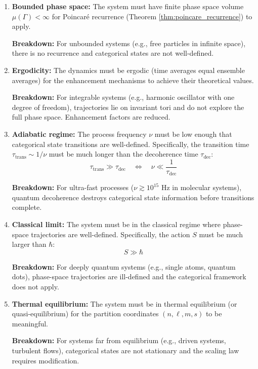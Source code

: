 \documentclass[twocolumn,10pt]{article}
\theoremstyle{remark}
\begin{document}
\begin{enumerate}
    \item \textbf{Bounded phase space:} The system must have finite phase space volume $\mu(\Gamma) < \infty$ for Poincaré recurrence (Theorem \ref{thm:poincare_recurrence}) to apply.
    
    \textbf{Breakdown:} For unbounded systems (e.g., free particles in infinite space), there is no recurrence and categorical states are not well-defined.
    
    \item \textbf{Ergodicity:} The dynamics must be ergodic (time averages equal ensemble averages) for the enhancement mechanisms to achieve their theoretical values.
    
    \textbf{Breakdown:} For integrable systems (e.g., harmonic oscillator with one degree of freedom), trajectories lie on invariant tori and do not explore the full phase space. Enhancement factors are reduced.
    
    \item \textbf{Adiabatic regime:} The process frequency $\nu$ must be low enough that categorical state transitions are well-defined. Specifically, the transition time $\tau_{\text{trans}} \sim 1/\nu$ must be much longer than the decoherence time $\tau_{\text{dec}}$:
    \begin{equation}
        \tau_{\text{trans}} \gg \tau_{\text{dec}} \quad \Leftrightarrow \quad \nu \ll \frac{1}{\tau_{\text{dec}}}
        \label{eq:adiabatic_condition}
    \end{equation}
    
    \textbf{Breakdown:} For ultra-fast processes ($\nu \gtrsim 10^{15}$ Hz in molecular systems), quantum decoherence destroys categorical state information before transitions complete.
    
    \item \textbf{Classical limit:} The system must be in the classical regime where phase-space trajectories are well-defined. Specifically, the action $S$ must be much larger than $\hbar$:
    \begin{equation}
        S \gg \hbar
        \label{eq:classical_condition}
    \end{equation}
    
    \textbf{Breakdown:} For deeply quantum systems (e.g., single atoms, quantum dots), phase-space trajectories are ill-defined and the categorical framework does not apply.
    
    \item \textbf{Thermal equilibrium:} The system must be in thermal equilibrium (or quasi-equilibrium) for the partition coordinates $(n, \ell, m, s)$ to be meaningful.
    
    \textbf{Breakdown:} For systems far from equilibrium (e.g., driven systems, turbulent flows), categorical states are not stationary and the scaling law requires modification.
\end{enumerate}
\end{document}
